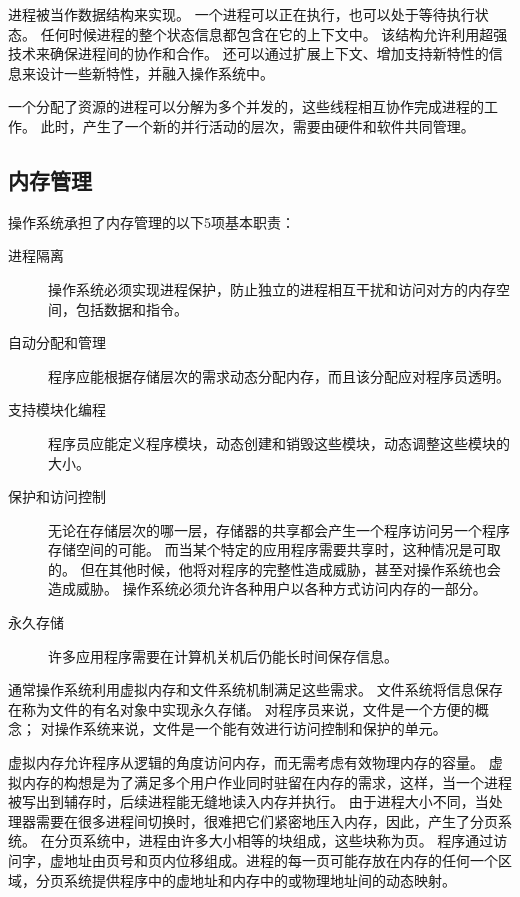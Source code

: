 {{        进程被当作数据结构来实现。
        一个进程可以正在执行，也可以处于等待执行状态。
        任何时候进程的整个状态信息都包含在它的上下文中。
        该结构允许利用超强技术来确保进程间的协作和合作。
        还可以通过扩展上下文、增加支持新特性的信息来设计一些新特性，并融入操作系统中。

        一个分配了资源的进程可以分解为多个并发的，这些线程相互协作完成进程的工作。
        此时，产生了一个新的并行活动的层次，需要由硬件和软件共同管理。
    }

    \subsection{内存管理}
    {
        操作系统承担了内存管理的以下5项基本职责：

        \begin{description}
            \item[进程隔离] 操作系统必须实现进程保护，防止独立的进程相互干扰和访问对方的内存空间，包括数据和指令。
            \item[自动分配和管理] 程序应能根据存储层次的需求动态分配内存，而且该分配应对程序员透明。
            \item[支持模块化编程] 程序员应能定义程序模块，动态创建和销毁这些模块，动态调整这些模块的大小。
            \item[保护和访问控制]
            {
                无论在存储层次的哪一层，存储器的共享都会产生一个程序访问另一个程序存储空间的可能。
                而当某个特定的应用程序需要共享时，这种情况是可取的。
                但在其他时候，他将对程序的完整性造成威胁，甚至对操作系统也会造成威胁。
                操作系统必须允许各种用户以各种方式访问内存的一部分。
            }
            \item[永久存储] 许多应用程序需要在计算机关机后仍能长时间保存信息。
        \end{description}

        通常操作系统利用虚拟内存和文件系统机制满足这些需求。
        文件系统将信息保存在称为文件的有名对象中实现永久存储。
        对程序员来说，文件是一个方便的概念；
        对操作系统来说，文件是一个能有效进行访问控制和保护的单元。

        虚拟内存允许程序从逻辑的角度访问内存，而无需考虑有效物理内存的容量。
        虚拟内存的构想是为了满足多个用户作业同时驻留在内存的需求，这样，当一个进程被写出到辅存时，后续进程能无缝地读入内存并执行。
        由于进程大小不同，当处理器需要在很多进程间切换时，很难把它们紧密地压入内存，因此，产生了分页系统。
        在分页系统中，进程由许多大小相等的块组成，这些块称为页。
        程序通过访问字，虚地址由页号和页内位移组成。进程的每一页可能存放在内存的任何一个区域，分页系统提供程序中的虚地址和内存中的或物理地址间的动态映射。

}}
